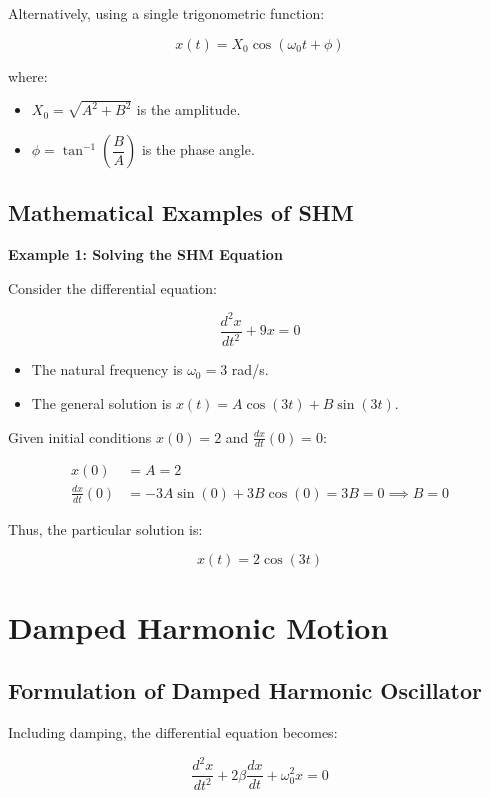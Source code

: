 \documentclass[12pt,a4paper]{article}
\begin{document}
Alternatively, using a single trigonometric function:

\[
x(t) = X_0 \cos(\omega_0 t + \phi)
\]

where:

\begin{itemize}
    \item \( X_0 = \sqrt{A^2 + B^2} \) is the amplitude.
    \item \( \phi = \tan^{-1}\left( \dfrac{B}{A} \right) \) is the phase angle.
\end{itemize}

\subsection{Mathematical Examples of SHM}

\textbf{Example 1: Solving the SHM Equation}

Consider the differential equation:

\[
\frac{d^2 x}{dt^2} + 9 x = 0
\]

\begin{itemize}
    \item The natural frequency is \( \omega_0 = 3 \) rad/s.
    \item The general solution is \( x(t) = A \cos(3 t) + B \sin(3 t) \).
\end{itemize}

Given initial conditions \( x(0) = 2 \) and \( \frac{dx}{dt}(0) = 0 \):

\begin{align*}
x(0) &= A = 2 \\
\frac{dx}{dt}(0) &= -3 A \sin(0) + 3 B \cos(0) = 3 B = 0 \implies B = 0
\end{align*}

Thus, the particular solution is:

\[
x(t) = 2 \cos(3 t)
\]

\section{Damped Harmonic Motion}

\subsection{Formulation of Damped Harmonic Oscillator}

Including damping, the differential equation becomes:

\[
\frac{d^2 x}{dt^2} + 2\beta \frac{dx}{dt} + \omega_0^2 x = 0
\]
\end{document}

